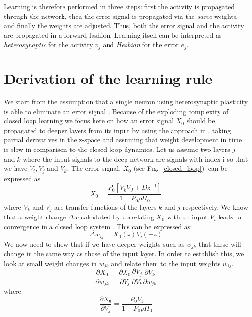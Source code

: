 \documentclass{article}
\begin{document}
Learning is therefore performed in three steps: first the activity is
propagated through the network, then the error signal is propagated
via the \textsl{same} weights, and finally the weights are adjusted. Thus,
both the error signal and the activity are propagated in a forward
fashion. Learning itself can be interpreted as \textsl{heterosynaptic} for the
activity $v_j$ and \textsl{Hebbian} for the error $e_j$.


\section{Derivation of the learning rule}
We start from the assumption that a single neuron using heterosynaptic
plasticity is able to eliminate an error signal
\cite{Porr2006ICO}. Because of the exploding complexity of closed loop
learning we focus here on how an error signal $X_0$ should be propagated
to deeper layers from its input by using the approach in
\cite{Mehta1986}, taking partial derivatives in the z-space and
assuming that weight development in time is slow in comparison to the
closed loop dynamics.  Let us assume two layers $j$ and $k$ where the
input signals to the deep network are signals with index i so that we
have $V_i, V_j$ and $V_k$. The error signal, $X_0$ (see
Fig.~\ref{closed_loop}), can be expressed as
\begin{equation}
  X_0 = \frac{P_0 \left[ V_k V_J + D z^{-1} \right]}{1-P_0 \rho H_0}
\end{equation}
where $V_k$ and $V_j$ are transfer functions of the layers $k$ and $j$
respectively. We know that a weight change $\Delta w$ calculated by
correlating $X_0$ with an input $V_i$ leads to convergence in a closed
loop system \cite{Porr2006ICO}. This can be expressed as:
\begin{equation}
  \Delta w_{ij} = X_0(z) V_i(-z)
\end{equation}
We now need to show that if we have deeper weights such as $w_{jk}$
that these will change in the same way as those of the input layer. In
order to establish this, we look at small weight changes in $w_{jk}$
and relate them to the input weights $w_{ij}$.
\begin{equation}
    \frac{\partial X_0}{\partial w_{jk}} =
    \frac{\partial X_0}{\partial V_j}
    \frac{\partial V_j}{\partial V_k}
    \frac{\partial V_k}{\partial w_{jk}}
\end{equation}    
where
\begin{equation}
\frac{\partial X_0}{\partial V_j} = \frac{P_0 V_k}{1-P_0 \rho H_0}
\end{equation}
\end{document}
